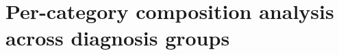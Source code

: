 \documentclass[runningheads]{llncs}
\begin{document}





\section{Per-category composition analysis across diagnosis groups}
\label{sec:supp_per_category}
\end{document}

